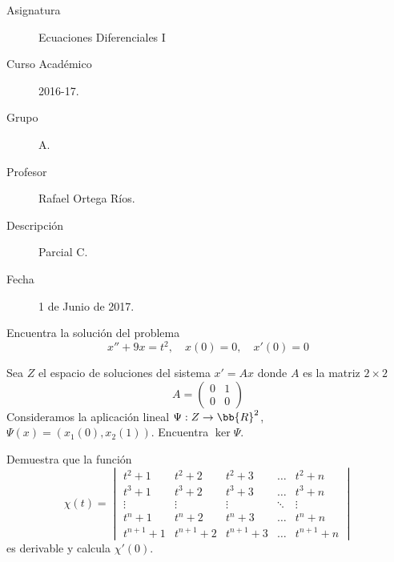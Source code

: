 \documentclass[12pt]{article}
\begin{document}

    
    

    \begin{description}
        \item[Asignatura] Ecuaciones Diferenciales I
        \item[Curso Académico] 2016-17.
        \item[Grupo] A.
        \item[Profesor] Rafael Ortega Ríos.
        \item[Descripción] Parcial C.
        \item[Fecha] 1 de Junio de 2017.
    
    \end{description}
    \newpage

    \begin{ejercicio}
        Encuentra la solución del problema
        \[
            x'' + 9x = t^2, \quad x(0) = 0, \quad x'(0) = 0
        \]
    \end{ejercicio}

    \begin{ejercicio}
        Sea $Z$ el espacio de soluciones del sistema $x' = Ax$ donde $A$ es la matriz $2\times 2$
        \[
            A=\begin{pmatrix}
                0 & 1 \\
                0 & 0
            \end{pmatrix}
        \]
        Consideramos la aplicación lineal $\Psi : Z \to \bb{R}^2$, $\Psi(x) = (x_1(0), x_2(1))$. Encuentra $\ker \Psi$.
    \end{ejercicio}

    \begin{ejercicio}
        Demuestra que la función
        \[
            \chi(t) = \begin{vmatrix}
                t^2+1 & t^2+2 & t^2+3 & \dots & t^2+n \\
                t^3+1 & t^3+2 & t^3+3 & \dots & t^3+n \\
                \vdots & \vdots & \vdots & \ddots & \vdots \\
                t^{n}+1 & t^{n}+2 & t^{n}+3 & \dots & t^{n}+n \\
                t^{n+1}+1 & t^{n+1}+2 & t^{n+1}+3 & \dots & t^{n+1}+n
            \end{vmatrix}
        \]
        es derivable y calcula $\chi'(0)$.
    \end{ejercicio}
\end{document}
